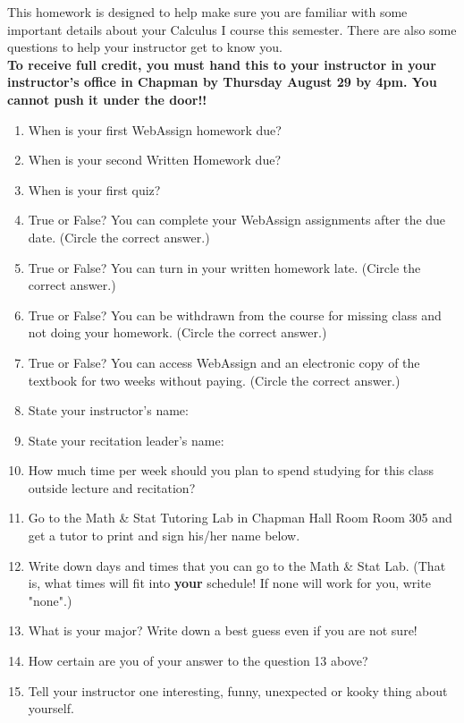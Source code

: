 \documentclass[12pt]{article}
\renewcommand{\emph}[1]{\textsf{\textbf{#1}}}
\begin{document}
This homework is designed to help make sure you are familiar with some important details about your Calculus I course this semester. There are also some questions to help your instructor get to know you.\\

\textbf{To receive full credit, you must hand this to your instructor in your instructor's office in Chapman by Thursday August 29 by 4pm. You cannot push it under the door!!}\\

\begin{enumerate} 
\item When is your first WebAssign homework due?
\vfill
\item When is your second Written Homework due?
\vfill
\item When is your first quiz?
\vfill 
\item True or False? You can complete your WebAssign assignments after the due date. (Circle the correct answer.)
\vfill
\item  True or False? You can turn in your written homework late. (Circle the correct answer.)
\vfill
\item  True or False? You can be withdrawn from the course for missing class and not doing your homework. (Circle the correct answer.)
\vfill
\item  True or False? You can access WebAssign and an electronic copy of the textbook for two weeks without paying. (Circle the correct answer.)
\vfill
\item State your instructor's name: 
\vfill
\item State your recitation leader's name: 
\vfill
\item How much time per week should you plan to spend studying for this class outside lecture and recitation?
\vfill
\newpage
\item Go to the Math \& Stat Tutoring Lab in Chapman Hall Room Room 305 and get a tutor to print and sign his/her name below.
\vfill
\item Write down days and times that you can go to the Math \& Stat Lab. (That is, what times will fit into \emph{your} schedule! If none will work for you, write "none".)
\vfill
\item What is your major? Write down a best guess even if you are not sure!
\vfill
\item How certain are you of your answer to the question 13 above? 
\vfill
\item Tell your instructor one interesting, funny, unexpected or kooky thing about yourself.
\vfill
\end{enumerate}
\end{document}
